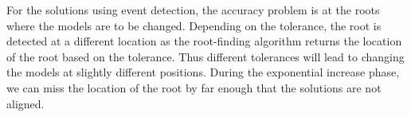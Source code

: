 \documentclass{article}
\begin{document}
For the solutions using event detection, the accuracy problem is at the roots where the models are to be changed. Depending on the tolerance, the root is detected at a different location as the root-finding algorithm returns the location of the root based on the tolerance. Thus different tolerances will lead to changing the models at slightly different positions. During the exponential increase phase, we can miss the location of the root by far enough that the solutions are not aligned.
\end{document}
